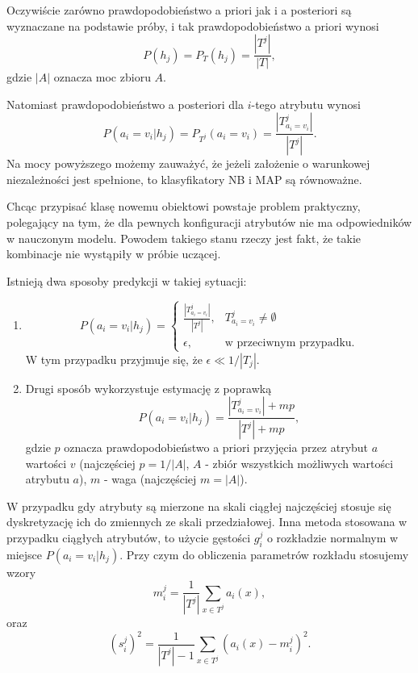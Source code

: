 \documentclass[
]{book}
\providecommand{\tightlist}{%
  \setlength{\itemsep}{0pt}\setlength{\parskip}{0pt}}
\theoremstyle{plain}
\theoremstyle{definition}
\theoremstyle{definition}
\theoremstyle{definition}
\theoremstyle{definition}
\theoremstyle{remark}
\begin{document}
Oczywiście zarówno prawdopodobieństwo a priori jak i a posteriori są wyznaczane na podstawie próby, i tak prawdopodobieństwo a priori wynosi
\begin{equation}\label{apriori}
        P(h_j)=P_T(h_j)=\frac{|T^j|}{|T|}, 
\end{equation}
gdzie \(|A|\) oznacza moc zbioru \(A\).

Natomiast prawdopodobieństwo a posteriori dla \(i\)-tego atrybutu wynosi
\begin{equation}\label{aposteriori}
        P(a_i=v_i|h_j)=P_{T^j}(a_i=v_i)=\frac{|T^j_{a_i=v_i}|}{|T^j|}.
\end{equation}
Na mocy powyższego możemy zauważyć, że jeżeli założenie o warunkowej niezależności jest spełnione, to klasyfikatory NB i MAP są równoważne.

Chcąc przypisać klasę nowemu obiektowi powstaje problem praktyczny, polegający na tym, że dla pewnych konfiguracji atrybutów nie ma odpowiedników w nauczonym modelu. Powodem takiego stanu rzeczy jest fakt, że takie kombinacje nie wystąpiły w próbie uczącej.

Istnieją dwa sposoby predykcji w takiej sytuacji:

\begin{enumerate}
\def\labelenumi{\arabic{enumi}.}
\tightlist
\item
  \begin{equation}\label{pred1}
           P(a_i=v_i|h_j)=
           \begin{cases}
               \frac{|T^j_{a_i=v_i}|}{|T^j|}, & T^j_{a_i=v_i}\neq \emptyset\\
               \epsilon, & \text{w przeciwnym przypadku.}
           \end{cases}
   \end{equation}
  W tym przypadku przyjmuje się, że \(\epsilon \ll 1/|T_j|\).
\item
  Drugi sposób wykorzystuje estymację z poprawką
  \begin{equation}\label{pred2}
       P(a_i=v_i|h_j)=\frac{|T^j_{a_i=v_i}|+mp}{|T^j|+mp},
  \end{equation}
  gdzie \(p\) oznacza prawdopodobieństwo a priori przyjęcia przez atrybut \(a\) wartości \(v\) (najczęściej \(p=1/|A|\), \(A\) - zbiór wszystkich możliwych wartości atrybutu \(a\)), \(m\) - waga (najczęściej \(m=|A|\)).
\end{enumerate}

W przypadku gdy atrybuty są mierzone na skali ciągłej najczęściej stosuje się dyskretyzację ich do zmiennych ze skali przedziałowej. Inna metoda stosowana w przypadku ciągłych atrybutów, to użycie gęstości \(g_i^j\) o rozkładzie normalnym w miejsce \(P(a_i=v_i|h_j)\). Przy czym do obliczenia parametrów rozkładu stosujemy wzory
\begin{equation}\label{sred}
        m_i^j=\frac{1}{|T^j|}\sum_{x\in T^j}a_i(x),
\end{equation}
oraz
\begin{equation}\label{odch}
        (s_i^j)^2=\frac{1}{|T^j|-1}\sum_{x\in T^j}(a_i(x)-m_i^j)^2.
\end{equation}
\end{document}
